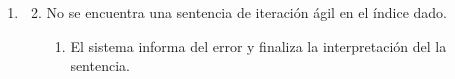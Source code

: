 \begin{framed}
\begin{description}
\begin{enumerate}
   \end{enumerate}
   \begin{enumerate} \itemsep1pt \parskip0pt 
   \setcounter{enumi}{0}
   \renewcommand{\labelenumi}{}
   \renewcommand{\labelenumiii}{\arabic{enumiii}.}
   \renewcommand{\labelenumii}{\arabic{enumi}\alph{enumii}.}
      \item 
      \begin {enumerate}
         \setcounter{enumii}{1}
         \item No se encuentra una sentencia de iteración ágil en el índice dado.
         \begin{enumerate}
         \item El sistema informa del error y finaliza la interpretación del 
         la sentencia.
         \end{enumerate}
      \end{enumerate}
   \end{enumerate}
\end{description}
 \FloatBarrier
\end{framed}
